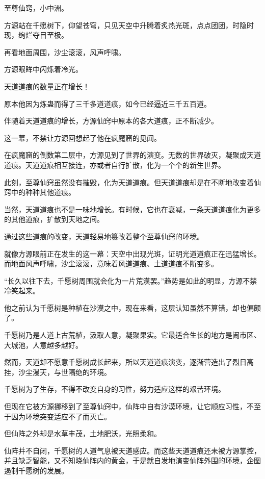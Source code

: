 
\begin{this_body}

至尊仙窍，小中洲。

方源站在千愿树下，仰望苍穹，只见天空中升腾着炙热光斑，点点团团，时隐时现，绚烂夺目至极。

再看地面周围，沙尘滚滚，风声呼啸。

方源眼眸中闪烁着冷光。

天道道痕的数量正在增长！

原本他因为炼蛊而得了三千多道道痕，如今已经逼近三千五百道。

伴随着天道道痕的增长，方源仙窍中原本的各大道痕，正不断减少。

这一幕，不禁让方源回想起了他在疯魔窟的见闻。

在疯魔窟的倒数第二层中，方源见到了世界的演变。无数的世界破灭，凝聚成天道道痕。天道道痕相互接连，亦或者自行扩散，化为一个个的新生世界。

此刻，至尊仙窍虽然没有摧毁，化为天道道痕。但天道道痕却是在不断地改变着仙窍中的种种其他道痕。

当然，天道道痕也不是一味地增长。有时候，它也在衰减，一条天道道痕化为更多的其他道痕，扩散到天地之间。

通过这些道痕的改变，天道轻易地篡改着整个至尊仙窍的环境。

就像方源眼前正在发生的这一幕：天空中出现光斑，证明光道道痕正在迅猛增长。而地面风声呼啸，沙尘滚滚，意味着风道道痕、土道道痕不断变多。

“长久以往下去，千愿树周围就会化为一片荒漠罢。”趋势是如此的明显，方源不禁冷笑起来。

他之前认为千愿树是种植在沙漠之中，现在来看，这层认知虽然不算错，却也偏颇了。

千愿树乃是人道上古荒植，汲取人意，凝聚果实。它最适合生长的地方是闹市区、大城池，人意越多越好。

然而，天道却不愿意千愿树成长起来，所以天道道痕演变，逐渐营造出了烈日高挂，沙尘漫天，与世隔绝的环境。

千愿树为了生存，不得不改变自身的习性，努力适应这样的艰苦环境。

但现在它被方源挪移到了至尊仙窍中，仙阵中自有沙漠环境，让它顺应习性，不至于因为环境突变适应不了而灭亡。

但仙阵之外却是水草丰茂，土地肥沃，光照柔和。

仙阵并不自闭，千愿树的人道气息被天道感应。而这些天道道痕还未被方源掌控，并且缺乏智能，又不知晓仙阵内的黄金，于是就自发地演变仙阵外围的环境，企图遏制千愿树的发展。


\end{this_body}
